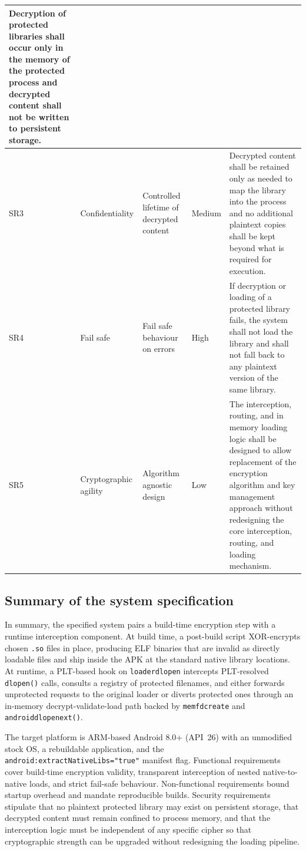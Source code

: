 \documentclass[11pt,a4paper]{report}
\renewcommand\_{{\textunderscore\allowbreak}}
\begin{document}
{\begin{longtable}{|p{}|p{}|p{}|p{}|p{}|}
        Decryption of protected libraries shall occur only in the memory of the protected process and decrypted content shall not be written to persistent storage. \\
        \hline
        SR3 & Confidentiality &
        Controlled lifetime of decrypted content & Medium &
        Decrypted content shall be retained only as needed to map the library into the process and no additional plaintext copies shall be kept beyond what is required for execution. \\
        \hline
        SR4 & Fail safe &
        Fail safe behaviour on errors & High &
        If decryption or loading of a protected library fails, the system shall not load the library and shall not fall back to any plaintext version of the same library. \\
        \hline
        SR5 & Cryptographic agility &
        Algorithm agnostic design & Low &
        The interception, routing, and in memory loading logic shall be designed to allow replacement of the encryption algorithm and key management approach without redesigning the core interception, routing, and loading mechanism. \\
        \hline
\end{longtable}
}%

\subsection{Summary of the system specification}

In summary, the specified system pairs a build-time encryption step with a runtime interception component.  At build time, a post-build script XOR-encrypts chosen \texttt{.so} files in place, producing ELF binaries that are invalid as directly loadable files and ship inside the APK at the standard native library locations.  At runtime, a PLT-based hook on \linebreak \texttt{\_\_loader\_dlopen} intercepts PLT-resolved \texttt{dlopen()} calls, consults a registry of protected filenames, and either forwards unprotected requests to the original loader or diverts protected ones through an in-memory decrypt-validate-load path backed by \texttt{memfd\_create} and \texttt{android\_dlopen\_ext()}.

The target platform is ARM-based Android 8.0+ (API~26) with an unmodified stock OS, a rebuildable application, and the \texttt{android:extractNativeLibs="true"} manifest flag.  Functional requirements cover build-time encryption validity, transparent interception of nested native-to-native loads, and strict fail-safe behaviour.  Non-functional requirements bound startup overhead and mandate reproducible builds.  Security requirements stipulate that no plaintext protected library may exist on persistent storage, that decrypted content must remain confined to process memory, and that the interception logic must be independent of any specific cipher so that cryptographic strength can be upgraded without redesigning the loading pipeline.
\end{document}
